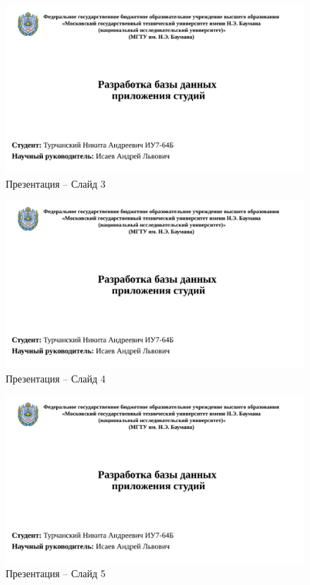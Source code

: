 \begin{appendices}
\begin{figure}[h]
	\begin{center}
		\includegraphics[page=3, width=\linewidth]{presentation.pdf}
	\end{center}
	\caption{Презентация -- Слайд 3}
\end{figure}

\begin{figure}[h]
	\begin{center}
		\includegraphics[page=4, width=\linewidth]{presentation.pdf}
	\end{center}
	\caption{Презентация -- Слайд 4}
\end{figure}

\begin{figure}[h]
	\begin{center}
		\includegraphics[page=5, width=\linewidth]{presentation.pdf}
	\end{center}
	\caption{Презентация -- Слайд 5}
\end{figure}


\end{appendices}
